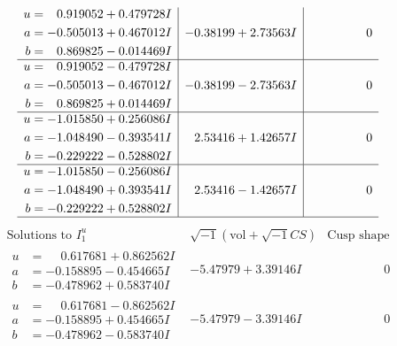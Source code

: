 \documentclass[1p]{elsarticle_modified}
\theoremstyle{definition}
\newcommand{\I}{\sqrt{-1}}
\begin{document}
$$\begin{array}{c|c|c}
\begin{aligned}
u &= \phantom{-}0.919052 + 0.479728 I \\
a &= -0.505013 + 0.467012 I \\
b &= \phantom{-}0.869825 - 0.014469 I\end{aligned}
 & -0.38199 + 2.73563 I & \phantom{-0.000000 } 0 \\ \hline\begin{aligned}
u &= \phantom{-}0.919052 - 0.479728 I \\
a &= -0.505013 - 0.467012 I \\
b &= \phantom{-}0.869825 + 0.014469 I\end{aligned}
 & -0.38199 - 2.73563 I & \phantom{-0.000000 } 0 \\ \hline\begin{aligned}
u &= -1.015850 + 0.256086 I \\
a &= -1.048490 - 0.393541 I \\
b &= -0.229222 - 0.528802 I\end{aligned}
 & \phantom{-}2.53416 + 1.42657 I & \phantom{-0.000000 } 0 \\ \hline\begin{aligned}
u &= -1.015850 - 0.256086 I \\
a &= -1.048490 + 0.393541 I \\
b &= -0.229222 + 0.528802 I\end{aligned}
 & \phantom{-}2.53416 - 1.42657 I & \phantom{-0.000000 } 0\\
 \hline 
 \end{array}$$\newpage$$\begin{array}{c|c|c}  
\text{Solutions to }I^u_{1}& \I (\text{vol} + \sqrt{-1}CS) & \text{Cusp shape}\\
 \hline 
\begin{aligned}
u &= \phantom{-}0.617681 + 0.862562 I \\
a &= -0.158895 - 0.454665 I \\
b &= -0.478962 + 0.583740 I\end{aligned}
 & -5.47979 + 3.39146 I & \phantom{-0.000000 } 0 \\ \hline\begin{aligned}
u &= \phantom{-}0.617681 - 0.862562 I \\
a &= -0.158895 + 0.454665 I \\
b &= -0.478962 - 0.583740 I\end{aligned}
 & -5.47979 - 3.39146 I & \phantom{-0.000000 } 0 \\ \hline\begin{aligned}

\end{aligned}
\end{array}$$
\end{document}

